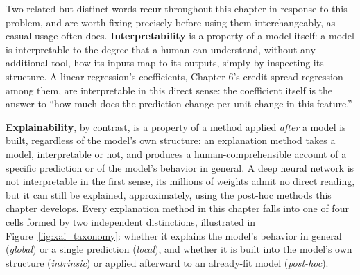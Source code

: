 \documentclass[../ai_in_finance]{subfiles}
\begin{document}
Two related but distinct words recur throughout this chapter in response to this problem, and are worth fixing precisely before using them interchangeably, as casual usage often does. \textbf{Interpretability} is a property of a model itself: a model is interpretable to the degree that a human can understand, without any additional tool, how its inputs map to its outputs, simply by inspecting its structure. A linear regression's coefficients, Chapter 6's credit-spread regression among them, are interpretable in this direct sense: the coefficient itself is the answer to ``how much does the prediction change per unit change in this feature.''

\textbf{Explainability}, by contrast, is a property of a method applied \emph{after} a model is built, regardless of the model's own structure: an explanation method takes a model, interpretable or not, and produces a human-comprehensible account of a specific prediction or of the model's behavior in general. A deep neural network is not interpretable in the first sense, its millions of weights admit no direct reading, but it can still be explained, approximately, using the post-hoc methods this chapter develops. Every explanation method in this chapter falls into one of four cells formed by two independent distinctions, illustrated in Figure~\ref{fig:xai_taxonomy}: whether it explains the model's behavior in general (\emph{global}) or a single prediction (\emph{local}), and whether it is built into the model's own structure (\emph{intrinsic}) or applied afterward to an already-fit model (\emph{post-hoc}).
\end{document}
